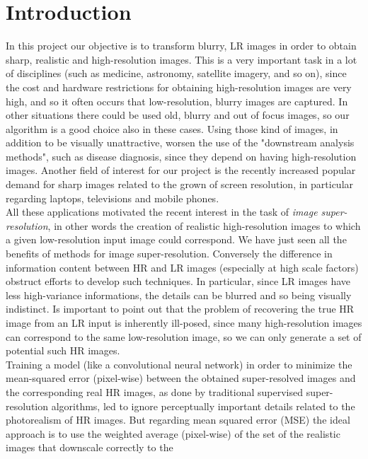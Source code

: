\documentclass[12pt]{article}
\begin{document}

\section{Introduction}
	In this project our objective is to transform blurry, LR images in order to obtain sharp, realistic and high-resolution
	images. This is a very important task in a lot of disciplines (such as medicine, astronomy, satellite imagery, and so on),
	since the cost and hardware restrictions for obtaining high-resolution images are very high, and so it often occurs that 
	low-resolution, blurry images are captured. In other situations there could be used old, blurry and out of focus images, so
	our algorithm is a good choice also in these cases. Using those kind of images, in addition to be visually unattractive, worsen
	the use of the "downstream analysis methods", such as disease diagnosis, since they depend on having high-resolution images.
	Another field of interest for our project is the recently increased popular demand for sharp images related to the grown of 
	screen resolution, in particular regarding laptops, televisions and mobile phones.\\
	All these applications motivated the recent interest in the task of \textit{image super-resolution}, in other words the creation
	of realistic high-resolution images to which a given low-resolution input image could correspond.
	We have just seen all the benefits of methods for image super-resolution. Conversely the difference in information content
	between HR and LR images (especially at high scale factors) obstruct efforts to develop such techniques.
	In particular, since LR images have less high-variance informations, the details can be blurred and so being
	visually indistinct. Is important to point out that the problem of recovering the true HR image from an LR input is inherently
	ill-posed, since many high-resolution images can correspond to the same low-resolution image, so we can only generate a set of 
	potential such HR images.\\
	Training a model (like a convolutional neural network) in order to minimize the mean-squared error (pixel-wise) between
	the obtained super-resolved images and the corresponding real HR images, as done by traditional supervised super-resolution
	algorithms, led to ignore perceptually important details related to the photorealism of HR images. But regarding mean squared error (MSE)
	the ideal approach is to use the weighted average (pixel-wise) of the set of the realistic images that downscale correctly to the
\end{document}

